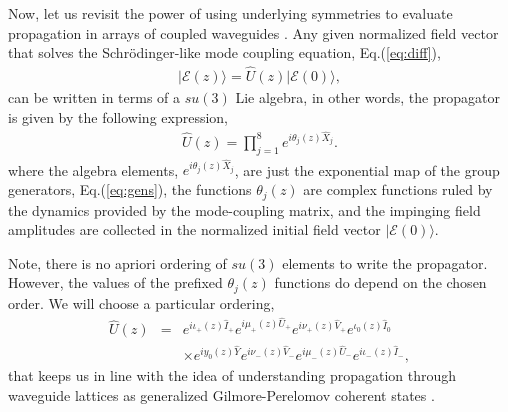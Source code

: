 \documentclass[9pt,twocolumn,twoside]{osajnl}
\begin{document}
Now, let us revisit the power of using underlying symmetries to evaluate propagation in arrays of coupled waveguides \cite{VillanuevaVergara2015p}. 
Any given normalized field vector that solves the Schr\"odinger-like mode coupling equation, Eq.(\ref{eq:diff}), 
\begin{eqnarray}
	\vert \mathcal{E}(z) \rangle = \hat{U}(z)  \vert 	\mathcal{E}(0) \rangle, \label{eq:sol}
\end{eqnarray}
can be written in terms of a $su(3)$ Lie algebra, in other words, the propagator is given by the following expression, 
\begin{eqnarray}
	\hat{U}(z) = \prod_{j=1}^{8} e^{i \theta_{j}(z) \hat{X}_{j}}.
\end{eqnarray}
where the algebra elements, $e^{i \theta_{j}(z) \hat{X}_{j}}$, are just the exponential map of the group generators, Eq.(\ref{eq:gens}), the functions $\theta_{j}(z)$ are complex functions ruled by the dynamics provided by the mode-coupling matrix, and the impinging field amplitudes are collected in the normalized initial field vector $\vert \mathcal{E}(0) \rangle$.

Note, there is no apriori ordering of $su(3)$ elements to write the propagator. 
However, the values of the prefixed $\theta_{j}(z)$ functions do depend on the chosen order.
We will choose a particular ordering,
\begin{eqnarray}
\hat{U}(z) &=& e^{i \iota_{+}(z) \hat{I}_{+}} e^{i \mu_{+}(z) \hat{U}_{+}}  
e^{i \nu_{+}(z) \hat{V}_{+}} e^{ \iota_{0}(z) \hat{I}_{0}} \nonumber \\ 
&& \times e^{i y_{0}(z) \hat{Y}}  e^{i \nu_{-}(z) \hat{V}_{-}} e^{i \mu_{-}(z) \hat{U}_{-}} e^{i \iota_{-}(z) \hat{I}_{-}}, \label{eq:prop}
\end{eqnarray}
that keeps us in line with the idea of understanding propagation through waveguide lattices as generalized Gilmore-Perelomov coherent states \cite{VillanuevaVergara2015p}.
\end{document}
